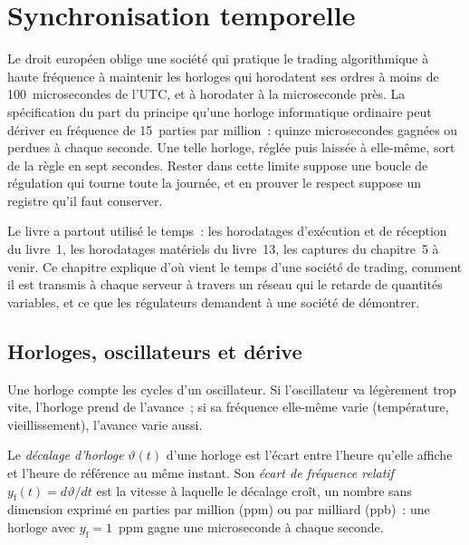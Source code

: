 \chapter{Synchronisation temporelle}\label{ch:nw:time-synchronisation}

Le droit européen oblige une société qui pratique le trading algorithmique à haute fréquence à maintenir les horloges qui horodatent ses
ordres à moins de 100~microsecondes de l'UTC, et à horodater à la microseconde près. La spécification du  part
du principe qu'une horloge informatique ordinaire peut dériver en fréquence de 15~parties par million~: quinze microsecondes gagnées
ou perdues à chaque seconde. Une telle horloge, réglée puis laissée à elle-même, sort de la règle en sept secondes. Rester dans
cette limite suppose une boucle de régulation qui tourne toute la journée, et en prouver le respect suppose un registre qu'il faut conserver.

Le livre a partout utilisé le temps~: les horodatages d'exécution et de réception du livre~1, les horodatages matériels du
livre~13, les captures du chapitre~5 à venir. Ce chapitre explique d'où vient le temps d'une société de trading, comment il est
transmis à chaque serveur à travers un réseau qui le retarde de quantités variables, et ce que les régulateurs demandent à une société de démontrer.

\section{Horloges, oscillateurs et dérive}

Une horloge compte les cycles d'un oscillateur. Si l'oscillateur va légèrement trop vite, l'horloge prend de l'avance~; si sa
fréquence elle-même varie (température, vieillissement), l'avance varie aussi.

\begin{definition}\label{def:nw:time-synchronisation:offset}
Le \emph{décalage d'horloge} $\vartheta(t)$ d'une horloge est l'écart entre l'heure qu'elle affiche et
l'heure de référence au même instant. Son \emph{écart de fréquence relatif} $y_{\mathrm f}(t) =
d\vartheta/dt$ est la vitesse à laquelle le décalage croît, un nombre sans dimension exprimé en parties par million (ppm) ou par
milliard (ppb)~: une horloge avec $y_{\mathrm f} = 1$~ppm gagne une microseconde à chaque seconde.
\end{definition}

